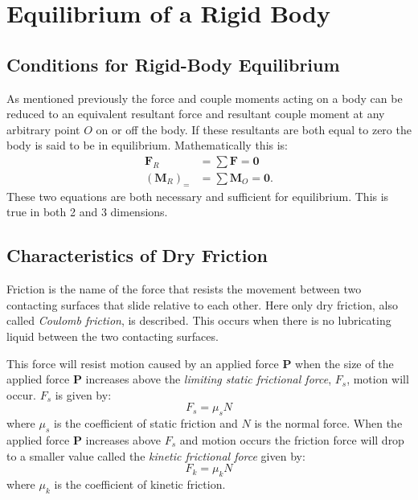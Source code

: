 
\section{Equilibrium of a Rigid Body}
\subsection{Conditions for Rigid-Body Equilibrium}
As mentioned previously the force and couple moments acting on a body can be reduced to an equivalent resultant force and resultant couple moment at any arbitrary point $O$ on or off the body. If these resultants are both equal to zero the body is said to be in equilibrium. Mathematically this is:
\begin{align*}
  \textbf{F}_R &= \sum \textbf{F} = \textbf{0} \\
  \left( \textbf{M}_R \right)_= &= \sum \textbf{M}_O = \textbf{0}
.\end{align*}
These two equations are both necessary and sufficient for equilibrium. This is true in both 2 and 3 dimensions.

\subsection{Characteristics of Dry Friction}
Friction is the name of the force that resists the movement between two contacting surfaces that slide relative to each other. Here only dry friction, also called \textit{Coulomb friction}, is described. This occurs when there is no lubricating liquid between the two contacting surfaces.

This force will resist motion caused by an applied force $\textbf{P}$ when the size of the applied force $\textbf{P}$ increases above the \textit{limiting static frictional force}, $F_s$, motion will occur. $F_s$ is given by:
\[ 
F_s = \mu_s N
\]
where $\mu_s$ is the coefficient of static friction and $N$ is the normal force. When the applied force $\textbf{P}$ increases above $F_s$ and motion occurs the friction force will drop to a smaller value called the \textit{kinetic frictional force} given by:
\[ 
F_k = \mu_k N
\]
where $\mu_k$ is the coefficient of kinetic friction.
